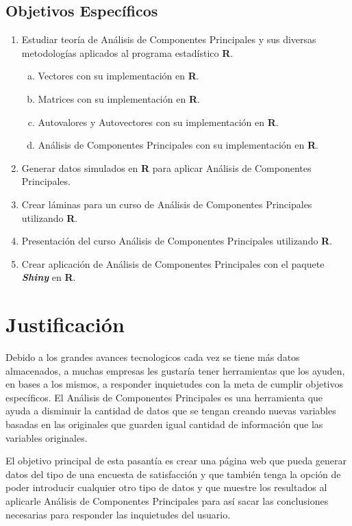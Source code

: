 \documentclass[12pt,letterpaper]{report} %
\begin{document}
\subsection{Objetivos Específicos}

\begin{enumerate}[1.]
	\item Estudiar teoría de Análisis de Componentes Principales y sus diversas metodologías aplicados al programa estadístico \textbf{R}.
	
	\begin{enumerate}[a)]
		\item Vectores con su implementación en \textbf{R}.
		\item Matrices con su implementación en \textbf{R}.
		\item Autovalores y Autovectores con su implementación en \textbf{R}.
		\item Análisis de Componentes Principales con su implementación en \textbf{R}.
	\end{enumerate}
	
	\item Generar datos simulados en \textbf{R} para aplicar Análisis de Componentes Principales.
	\item Crear láminas para un curso de Análisis de Componentes Principales utilizando \textbf{R}.	
	\item Presentación del curso Análisis de Componentes Principales utilizando \textbf{R}.
	\item Crear aplicación de Análisis de Componentes Principales con el paquete \textbf{\textit{Shiny}} en \textbf{R}.
	
\end{enumerate}

\section{Justificación}

Debido a los grandes avances tecnologicos cada vez se tiene más datos almacenados, a muchas empresas les gustaría tener herramientas que los ayuden, en bases a los mismos, a responder inquietudes con la meta de cumplir objetivos específicos. El Análisis de Componentes Principales es una herramienta que ayuda a disminuir la cantidad de datos que se tengan creando nuevas variables basadas en las originales que guarden igual cantidad de información que las variables originales.

El objetivo principal de esta pasantía es crear una página web que pueda generar datos del tipo de una encuesta de satisfacción y que también tenga la opción de poder introducir cualquier otro tipo de datos y que muestre los resultados al aplicarle Análisis de Componentes Principales para así sacar las conclusiones necesarias para responder las inquietudes del usuario.
\end{document}
